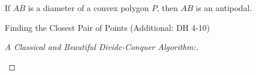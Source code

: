 \begin{frame}{}
  \begin{theorem}
    If $AB$ is a diameter of a convex polygon $P$, then $AB$ is an antipodal.
  \end{theorem}

  \vspace{0.30cm}
  \begin{center}
    
  \end{center}

  \vspace{0.30cm}

\end{frame}

\begin{frame}{}
  \begin{exampleblock}{Finding the Closest Pair of Points (Additional: DH 4-10)}
  \end{exampleblock}

  \pause
  \begin{proof}[A Classical and Beautiful Divide-Conquer{} Algorithm:]
    \vspace{-0.60cm}
    \begin{center}
      {}
    \end{center}
  \end{proof}
\end{frame}
